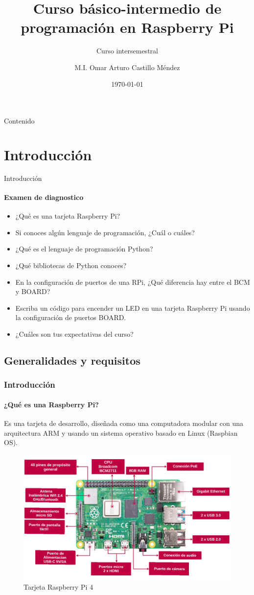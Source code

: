 \documentclass{beamer}
\title{Curso básico-intermedio de programación en Raspberry Pi}
\subtitle{Curso intersemestral}
\date{\today}
\author[OACM]{M.I. Omar Arturo Castillo Méndez}
\begin{document}
	
	\begin{frame}[plain]
		\titlepage
	\end{frame}
	
	\begin{frame}{Contenido}
		\tableofcontents
	\end{frame}
	
	\section{Introducción}
	
	\begin{frame}{Introducción}
		\framesubtitle{Examen de diagnostico}
		\begin{itemize}
			\item ¿Qué es una tarjeta Raspberry Pi?
			\item Si conoces algún lenguaje de programación, ¿Cuál o cuáles?
			\item ¿Qué es el lenguaje de programación Python?
			\item ¿Qué bibliotecas de Python conoces?
			\item En la configuración de puertos de una RPi, ¿Qué diferencia hay entre el BCM y BOARD?
			\item Escriba un código para encender un LED en una tarjeta Raspberry Pi usando la configuración de puertos BOARD.
			\item ¿Cuáles son tus expectativas del curso?
		\end{itemize}
	\end{frame}
	\subsection{Generalidades y requisitos}
	\begin{frame}
		\frametitle{Introducción}
		\framesubtitle{¿Qué es una Raspberry Pi?}
		Es una tarjeta de desarrollo, diseñada como una computadora modular con una arquitectura ARM y usando un sistema operativo basado en Linux (Raspbian OS).
		\begin{figure}
			\includegraphics[scale=0.4]{rpiboard}
			\caption{Tarjeta Raspberry Pi 4}
		\end{figure}
		
	\end{frame}	
\end{document}

